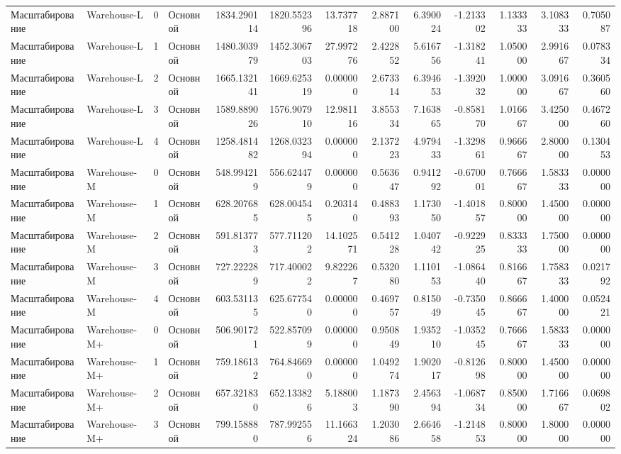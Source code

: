 \begin{tabular}{llrlrrrrrrrrr}
 Масштабирование & Warehouse-L & 0 & Основной & 1834.290114 & 1820.552396 & 13.737718 & 2.887100 & 6.390024 & -1.213302 & 1.133333 & 3.108333 & 0.705087 \\
 Масштабирование & Warehouse-L & 1 & Основной & 1480.303979 & 1452.306703 & 27.997276 & 2.422852 & 5.616756 & -1.318241 & 1.050000 & 2.991667 & 0.078334 \\
 Масштабирование & Warehouse-L & 2 & Основной & 1665.132141 & 1669.625319 & 0.000000 & 2.673314 & 6.394653 & -1.392032 & 1.000000 & 3.091667 & 0.360560 \\
 Масштабирование & Warehouse-L & 3 & Основной & 1589.889026 & 1576.907910 & 12.981116 & 3.855334 & 7.163865 & -0.858170 & 1.016667 & 3.425000 & 0.467260 \\
 Масштабирование & Warehouse-L & 4 & Основной & 1258.481482 & 1268.032394 & 0.000000 & 2.137223 & 4.979433 & -1.329861 & 0.966667 & 2.800000 & 0.130453 \\
 Масштабирование & Warehouse-M & 0 & Основной & 548.994219 & 556.624479 & 0.000000 & 0.563647 & 0.941292 & -0.670001 & 0.766667 & 1.583333 & 0.000000 \\
 Масштабирование & Warehouse-M & 1 & Основной & 628.207685 & 628.004545 & 0.203140 & 0.488393 & 1.173050 & -1.401857 & 0.800000 & 1.450000 & 0.000000 \\
 Масштабирование & Warehouse-M & 2 & Основной & 591.813773 & 577.711202 & 14.102571 & 0.541228 & 1.040742 & -0.922925 & 0.833333 & 1.750000 & 0.000000 \\
 Масштабирование & Warehouse-M & 3 & Основной & 727.222289 & 717.400022 & 9.822267 & 0.532080 & 1.110153 & -1.086440 & 0.816667 & 1.758333 & 0.021792 \\
 Масштабирование & Warehouse-M & 4 & Основной & 603.531135 & 625.677540 & 0.000000 & 0.469757 & 0.815049 & -0.735045 & 0.866667 & 1.400000 & 0.052421 \\
 Масштабирование & Warehouse-M+ & 0 & Основной & 506.901721 & 522.857099 & 0.000000 & 0.950849 & 1.935210 & -1.035245 & 0.766667 & 1.583333 & 0.000000 \\
 Масштабирование & Warehouse-M+ & 1 & Основной & 759.186132 & 764.846690 & 0.000000 & 1.049274 & 1.902017 & -0.812698 & 0.800000 & 1.450000 & 0.000000 \\
 Масштабирование & Warehouse-M+ & 2 & Основной & 657.321830 & 652.133826 & 5.188003 & 1.187390 & 2.456394 & -1.068734 & 0.850000 & 1.716667 & 0.069802 \\
 Масштабирование & Warehouse-M+ & 3 & Основной & 799.158880 & 787.992556 & 11.166324 & 1.203086 & 2.664658 & -1.214853 & 0.800000 & 1.800000 & 0.000000 \\

\end{tabular}
